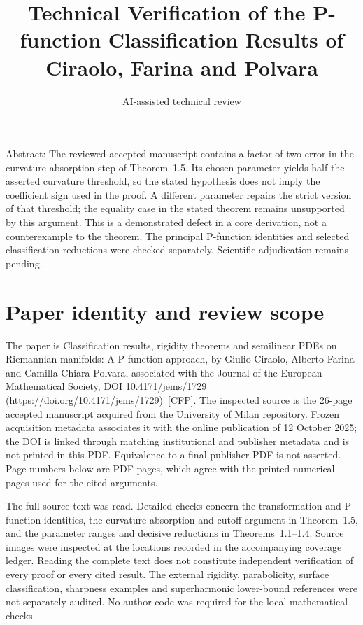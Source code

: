 \documentclass[10pt]{article}
\title{Technical Verification of the P-function Classification Results of Ciraolo, Farina and Polvara}
\author{AI-assisted technical review}
\date{}
\begin{document}
\maketitle
Abstract: The reviewed accepted manuscript contains a factor-of-two error in the curvature absorption step of Theorem 1.5. Its chosen parameter yields half the asserted curvature threshold, so the stated hypothesis does not imply the coefficient sign used in the proof. A different parameter repairs the strict version of that threshold; the equality case in the stated theorem remains unsupported by this argument. This is a demonstrated defect in a core derivation, not a counterexample to the theorem. The principal P-function identities and selected classification reductions were checked separately. Scientific adjudication remains pending.\par
\section*{Paper identity and review scope}
The paper is Classification results, rigidity theorems and semilinear PDEs on Riemannian manifolds: A P-function approach, by Giulio Ciraolo, Alberto Farina and Camilla Chiara Polvara, associated with the Journal of the European Mathematical Society, DOI 10.4171/jems/1729 (https://doi.org/10.4171/jems/1729) [CFP]. The inspected source is the 26-page accepted manuscript acquired from the University of Milan repository. Frozen acquisition metadata associates it with the online publication of 12 October 2025; the DOI is linked through matching institutional and publisher metadata and is not printed in this PDF. Equivalence to a final publisher PDF is not asserted. Page numbers below are PDF pages, which agree with the printed numerical pages used for the cited arguments.\par
The full source text was read. Detailed checks concern the transformation and P-function identities, the curvature absorption and cutoff argument in Theorem 1.5, and the parameter ranges and decisive reductions in Theorems 1.1–1.4. Source images were inspected at the locations recorded in the accompanying coverage ledger. Reading the complete text does not constitute independent verification of every proof or every cited result. The external rigidity, parabolicity, surface classification, sharpness examples and superharmonic lower-bound references were not separately audited. No author code was required for the local mathematical checks.\par
\end{document}
